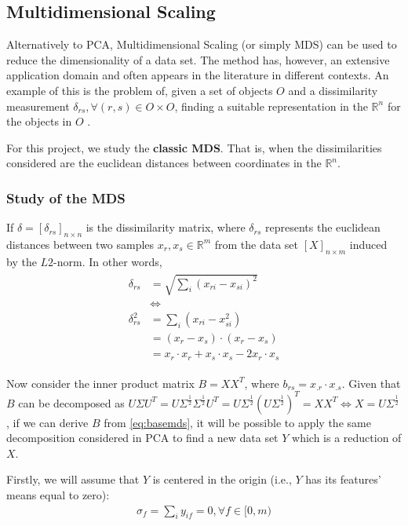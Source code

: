 \documentclass[12pt]{article}
\begin{document}
\subsection{Multidimensional Scaling}

Alternatively to PCA, Multidimensional Scaling (or simply MDS) can be used to reduce the dimensionality of a data set. The method has, however, an extensive application domain and often appears in the literature in different contexts. An example of this is the problem of, given a set of objects $O$ and a dissimilarity measurement $\delta_{rs}, \forall (r, s) \in O\times O$, finding a suitable representation in the $\mathbb{R}^n$ for the objects in $O$ \cite{cox2001}.

For this project, we study the \textbf{classic MDS}. That is, when the dissimilarities considered are the euclidean distances between coordinates in the $\mathbb{R}^n$.

\subsubsection{Study of the MDS}

If $\delta = [\delta_{rs}]_{n\times n}$ is the dissimilarity matrix, where $\delta_{rs}$ represents the euclidean distances between two samples $x_r, x_s\in \mathbb{R}^m$ from the data set $[X]_{n\times m}$ induced by the $L2$-norm. In other words,
\begin{align}
\label{eq:basemds}
\begin{split}
  \delta_{rs}  &= \sqrt{\sum_i (x_{ri}-x_{si})^2} \\
  &\iff \\
  \delta_{rs}^2 &= \sum_i (x_{ri}-x_{si}^2) \\
  &= (x_r-x_s)\cdot (x_r-x_s) \\
  &= x_r\cdot x_r + x_s\cdot x_s -2x_r\cdot x_s
\end{split}
\end{align}

Now consider the inner product matrix $B=XX^T$, where $b_{rs}=x_{.r}\cdot x_{.s}$. Given that $B$ can be decomposed as $U\Sigma U^T=U\Sigma^\frac{1}{2} \Sigma^\frac{1}{2} U^T=U\Sigma^\frac{1}{2} (U\Sigma^\frac{1}{2})^T = XX^T\iff X=U\Sigma^\frac{1}{2}$, if we can derive $B$ from \ref{eq:basemds}, it will be possible to apply the same decomposition considered in PCA to find a new data set $Y$ which is a reduction of $X$. \cite{cox2001}

Firstly, we will assume that $Y$ is centered in the origin (i.e., $Y$ has its features' means equal to zero):
\begin{align}
\sigma_f = \sum_i y_{if} = 0, \forall f\in [0, m)
\end{align}
\end{document}
